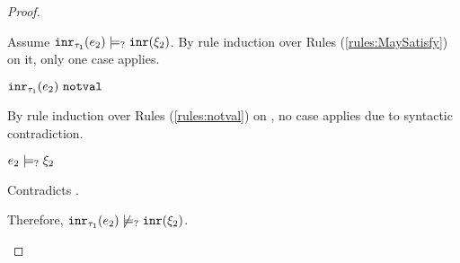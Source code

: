 \begin{proof}
\begin{byCases}
\begin{byCases}
\begin{byCases}
            Assume $\mathtt{inr}_{\tau_1}({e_2}) \models_{?} \mathtt{inr}(\xi_2)$. By rule induction over Rules (\ref{rules:MaySatisfy}) on it, only one case applies.
            \begin{byCases}
            \item[\text{(\ref{rule:CMSNotVal})}]
                \begin{pfsteps*}
                \item $\mathtt{inr}_{\tau_1}({e_2}) ~\mathtt{notval}$  
                \end{pfsteps*}
                By rule induction over Rules (\ref{rules:notval}) on , no case applies due to syntactic contradiction.
            \item[\text{(\ref{rule:CMSInr})}]
                \begin{pfsteps*}
                \item $e_2 \models_{?} \xi_2$
                \end{pfsteps*}
                Contradicts .
            \end{byCases}
            Therefore, $\mathtt{inr}_{\tau_1}({e_2}) \not\models_{?} \mathtt{inr}(\xi_2)$.
        \end{byCases}
    \end{byCases}


\end{byCases}
\end{proof}
